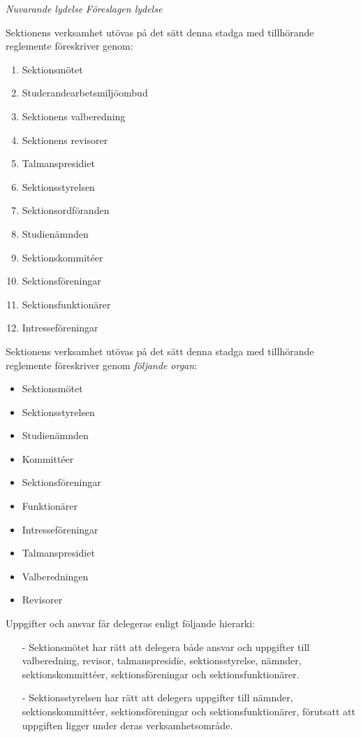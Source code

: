 \documentclass{article}
\newenvironment{lydelse}
    {\begin{paracol}{2}%
        \emph{Nuvarande lydelse}%
        \switchcolumn%
        \emph{Föreslagen lydelse}%
    \end{paracol}%
    \begin{enumerate}[label=\thesubsection.\arabic*]%
    \begin{paracol}{2}%
    }{\end{paracol}\end{enumerate}}
\begin{document}
\begin{lydelse}
    \item Sektionens verksamhet ut\-övas på det sätt denna stadga med
   till\-hör\-ande regle\-mente föreskriver genom:
      \begin{enumerate}[label=\arabic*]
       \item Sektionsmötet
       \item Studerandearbetsmiljöombud
       \item Sektionens valberedning
       \item Sektionens revisorer
       \item Talmanspresidiet
       \item Sektionsstyrelsen
	   \item Sektionsordföranden
       \item Studienämnden
       \item Sektionskommitéer
       \item Sektionsföreningar
       \item Sektionsfunktionärer
       \item Intresseföreningar
      \end{enumerate}
    
  \switchcolumn
  \setcounter{enumi}{0}
    
    \item Sektionens verksamhet utövas på det sätt denna stadga med
   tillhörande reglemente föreskriver genom \emph{följande organ}:
      \begin{itemize}
       \item Sektionsmötet
       \item Sektionsstyrelsen
       \item Studienämnden
       \item Kommittéer
       \item Sektionsföreningar
       \item Funktionärer
       \item Intresseföreningar
       \item Talmanspresidiet
       \item Valberedningen
       \item Revisorer
      \end{itemize}
    
  \switchcolumn*
  \setcounter{enumi}{1}
    
	  \item Uppgifter och ansvar får delegeras enligt följande hierarki:
		\begin{enumerate}
			\item[-] Sektionsmötet har rätt att delegera både ansvar och uppgifter till valberedning, revisor, talmanspresidie, sektionsstyrelse, nämnder, sektionskommittéer, sektionsföreningar och sektionsfunktionärer.
			\item[-] Sektionsstyrelsen har rätt att delegera uppgifter till nämnder,  sektionskommittéer, sektionsföreningar och sektionsfunktionärer, förutsatt att uppgiften ligger under deras verksamhetsområde.
		\end{enumerate}
	

\end{lydelse}
\end{document}
